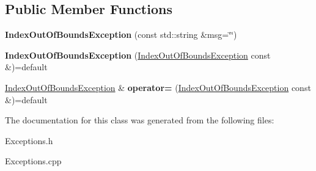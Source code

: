 \subsection*{Public Member Functions}
\begin{DoxyCompactItemize}
\item 
\mbox{\label{classantlr4_1_1IndexOutOfBoundsException_a9881e23a86259d597cd1c993a4ab462a}} 
{\bfseries Index\+Out\+Of\+Bounds\+Exception} (const std\+::string \&msg=\char`\"{}\char`\"{})
\item 
\mbox{\label{classantlr4_1_1IndexOutOfBoundsException_a3ce970d41dfd075e82dc2321993151ac}} 
{\bfseries Index\+Out\+Of\+Bounds\+Exception} (\hyperlink{classantlr4_1_1IndexOutOfBoundsException}{Index\+Out\+Of\+Bounds\+Exception} const \&)=default
\item 
\mbox{\label{classantlr4_1_1IndexOutOfBoundsException_a004fe2ef7135e52efb0acc569372fc58}} 
\hyperlink{classantlr4_1_1IndexOutOfBoundsException}{Index\+Out\+Of\+Bounds\+Exception} \& {\bfseries operator=} (\hyperlink{classantlr4_1_1IndexOutOfBoundsException}{Index\+Out\+Of\+Bounds\+Exception} const \&)=default
\end{DoxyCompactItemize}


The documentation for this class was generated from the following files\+:\begin{DoxyCompactItemize}
\item 
Exceptions.\+h\item 
Exceptions.\+cpp\end{DoxyCompactItemize}
